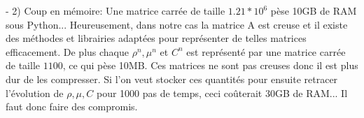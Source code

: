 \documentclass[11pt]{article}
\begin{document}
\begin{paragraph}
- 2) Coup en mémoire: Une matrice carrée de taille $1.21*10^6$ pèse 10GB de RAM sous Python... Heureusement, dans notre cas la matrice A est creuse et il existe des méthodes et librairies adaptées pour représenter de telles matrices efficacement. De plus chaque $\rho^n,\mu^n$ et $C^n$ est représenté par une matrice carrée de taille $1100$, ce qui pèse 10MB. Ces matrices ne sont pas creuses donc il est plus dur de les compresser. Si l'on veut stocker ces quantités pour ensuite retracer l’évolution de $\rho,\mu,C$ pour 1000 pas de temps, ceci coûterait 30GB de RAM... Il faut donc faire des compromis.
\end{paragraph}
\ifdefined\COMPLETE
\else
\end{document}
